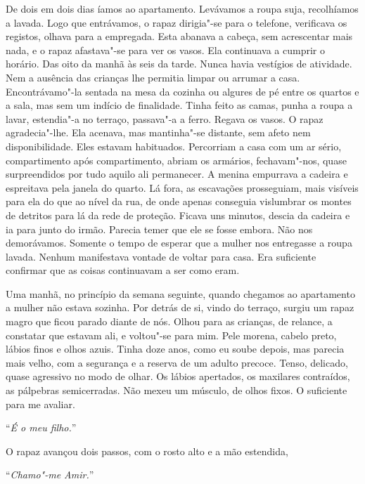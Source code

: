 De dois em dois dias íamos ao apartamento. Levávamos a roupa suja,
recolhíamos a lavada. Logo que entrávamos, o rapaz dirigia"-se para o
telefone, verificava os registos, olhava para a empregada. Esta abanava
a cabeça, sem acrescentar mais nada, e o rapaz afastava"-se para ver os
vasos. Ela continuava a cumprir o horário. Das oito da manhã às seis da
tarde. Nunca havia vestígios de atividade. Nem a ausência das crianças
lhe permitia limpar ou arrumar a casa. Encontrávamo"-la sentada na mesa
da cozinha ou algures de pé entre os quartos e a sala, mas sem um
indício de finalidade. Tinha feito as camas, punha a roupa a lavar,
estendia"-a no terraço, passava"-a a ferro. Regava os vasos. O rapaz
agradecia"-lhe. Ela acenava, mas mantinha"-se distante, sem afeto nem
disponibilidade. Eles estavam habituados. Percorriam a casa com um ar
sério, compartimento após compartimento, abriam os armários,
fechavam"-nos, quase surpreendidos por tudo aquilo ali permanecer. A
menina empurrava a cadeira e espreitava pela janela do quarto. Lá fora,
as escavações prosseguiam, mais visíveis para ela do que ao nível da
rua, de onde apenas conseguia vislumbrar os montes de detritos para lá
da rede de proteção. Ficava uns minutos, descia da cadeira e ia para
junto do irmão. Parecia temer que ele se fosse embora. Não nos
demorávamos. Somente o tempo de esperar que a mulher nos entregasse a
roupa lavada. Nenhum manifestava vontade de voltar para casa. Era
suficiente confirmar que as coisas continuavam a ser como eram.

Uma manhã, no princípio da semana seguinte, quando chegamos ao
apartamento a mulher não estava sozinha. Por detrás de si, vindo do
terraço, surgiu um rapaz magro que ficou parado diante de nós. Olhou
para as crianças, de relance, a constatar que estavam ali, e voltou"-se
para mim. Pele morena, cabelo preto, lábios finos e olhos azuis. Tinha
doze anos, como eu soube depois, mas parecia mais velho, com a segurança
e a reserva de um adulto precoce. Tenso, delicado, quase agressivo no
modo de olhar. Os lábios apertados, os maxilares contraídos, as
pálpebras semicerradas. Não mexeu um músculo, de olhos fixos. O
suficiente para me avaliar.

``\emph{É o meu filho.}''

O rapaz avançou dois passos, com o rosto alto e a mão estendida,

``\emph{Chamo"-me Amir.}''

